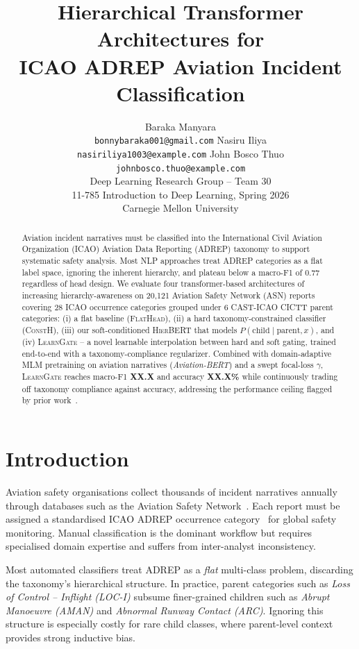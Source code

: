 \documentclass{article}
\title{Hierarchical Transformer Architectures for\\[-3pt]
ICAO ADREP Aviation Incident Classification}
\author{
Baraka Manyara \\
\texttt{bonnybaraka001@gmail.com}
\And
Nasiru Iliya \\
\texttt{nasiriliya1003@example.com} %
\And
John Bosco Thuo \\
\texttt{johnbosco.thuo@example.com} %
\\
\AND
Deep Learning Research Group -- Team 30 \\
11-785 Introduction to Deep Learning, Spring 2026 \\
Carnegie Mellon University
}
\newcommand{\modA}{\textsc{FlatHead}}
\newcommand{\modB}{\textsc{ConstH}}
\newcommand{\modC}{\textsc{HierBERT}}
\newcommand{\modD}{\textsc{LearnGate}}
\begin{document}
\maketitle

\begin{abstract}
Aviation incident narratives must be classified into the International Civil
Aviation Organization (ICAO) Aviation Data Reporting (ADREP) taxonomy to
support systematic safety analysis.
Most NLP approaches treat ADREP categories as a flat label space, ignoring
the inherent hierarchy, and plateau below a macro-F1 of 0.77 regardless of
head design.
We evaluate four transformer-based architectures of increasing
hierarchy-awareness on 20{,}121 Aviation Safety Network (ASN) reports
covering 28 ICAO occurrence categories grouped under 6 CAST-ICAO CICTT
parent categories:
(i) a flat baseline (\modA),
(ii) a hard taxonomy-constrained classifier (\modB),
(iii) our soft-conditioned \modC{} that models $P(\mathrm{child}\mid\mathrm{parent},x)$, and
(iv) \modD{} -- a novel learnable interpolation between hard and soft
gating, trained end-to-end with a taxonomy-compliance regularizer.
Combined with domain-adaptive MLM pretraining on aviation narratives
(\textit{Aviation-BERT}) and a swept focal-loss $\gamma$, \modD{}
reaches macro-F1 %
\textbf{XX.X} and accuracy \textbf{XX.X\%}
while continuously trading off taxonomy compliance against accuracy,
addressing the performance ceiling flagged by prior work~\cite{jing2023bert}.
\end{abstract}

\section{Introduction}

Aviation safety organisations collect thousands of incident narratives
annually through databases such as the Aviation Safety
Network~\cite{asn2024}.
Each report must be assigned a standardised ICAO ADREP occurrence
category~\cite{icao_adrep2013} for global safety monitoring.
Manual classification is the dominant workflow but requires specialised
domain expertise and suffers from inter-analyst inconsistency.

Most automated classifiers treat ADREP as a \emph{flat} multi-class
problem, discarding the taxonomy's hierarchical structure.
In practice, parent categories such as \textit{Loss of Control --
Inflight (LOC-I)} subsume finer-grained children such as
\textit{Abrupt Manoeuvre (AMAN)} and \textit{Abnormal Runway Contact
(ARC)}.
Ignoring this structure is especially costly for rare child classes,
where parent-level context provides strong inductive bias.
\end{document}
